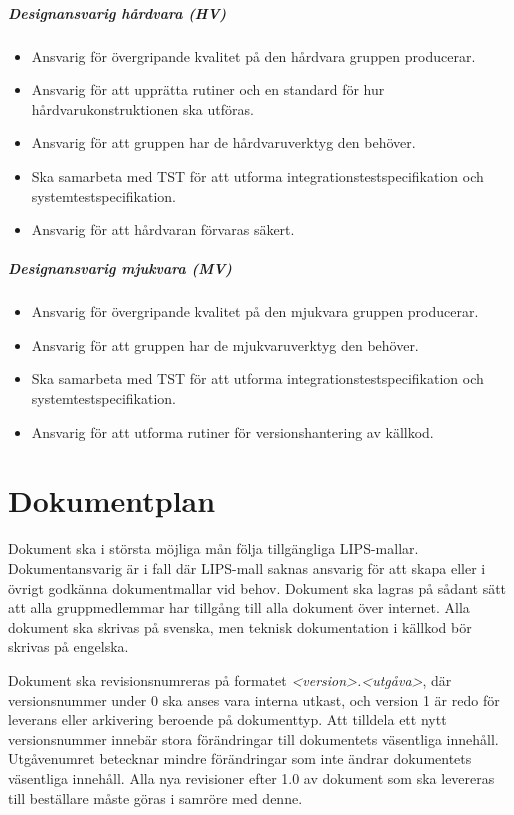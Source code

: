 \documentclass[a4paper,11pt]{article}
\begin{document}
\subparagraph{Designansvarig hårdvara (HV)}
\begin{itemize}
\item Ansvarig för övergripande kvalitet på den hårdvara gruppen producerar.
\item Ansvarig för att upprätta rutiner och en standard för hur hårdvarukonstruktionen ska utföras.
\item Ansvarig för att gruppen har de hårdvaruverktyg den behöver.
\item Ska samarbeta med TST för att utforma integrationstestspecifikation och systemtestspecifikation.
\item Ansvarig för att hårdvaran förvaras säkert.
\end{itemize}

\subparagraph{Designansvarig mjukvara (MV)}
\begin{itemize}
\item Ansvarig för övergripande kvalitet på den mjukvara gruppen producerar.
\item Ansvarig för att gruppen har de mjukvaruverktyg den behöver.
\item Ska samarbeta med TST för att utforma integrationstestspecifikation och systemtestspecifikation.
\item Ansvarig för att utforma rutiner för versionshantering av källkod.
\end{itemize}

\section{Dokumentplan}
\label{sec:doc_plan}
Dokument ska i största möjliga mån följa tillgängliga LIPS-mallar. Dokumentansvarig är i fall där LIPS-mall saknas ansvarig för att skapa eller i övrigt godkänna dokumentmallar vid behov. Dokument ska lagras på sådant sätt att alla gruppmedlemmar har tillgång till alla dokument över internet. Alla dokument ska skrivas på svenska, men teknisk dokumentation i källkod bör skrivas på engelska. 

Dokument ska revisionsnumreras på formatet \textit{\textless version\textgreater .\textless utgåva\textgreater}, där versionsnummer under 0 ska anses vara interna utkast, och version 1 är redo för leverans eller arkivering beroende på dokumenttyp. Att tilldela ett nytt versionsnummer innebär stora förändringar till dokumentets väsentliga innehåll. Utgåvenumret betecknar mindre förändringar som inte ändrar dokumentets väsentliga innehåll. Alla nya revisioner efter 1.0 av dokument som ska levereras till beställare måste göras i samröre med denne.
\end{document}
